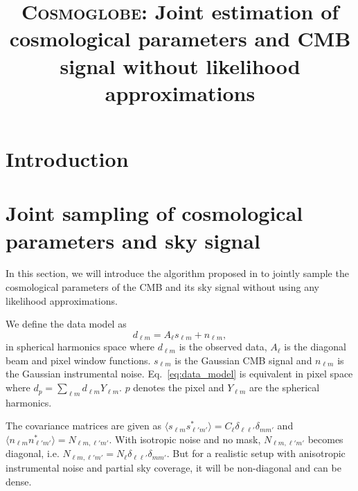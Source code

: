 \documentclass[twocolumn]{../common/aa}
\newcommand{\Cosmoglobe}{\textsc{Cosmoglobe}}
\begin{document}
\title{\bfseries{\Cosmoglobe: Joint estimation of cosmological parameters and CMB signal without likelihood approximations}}




\maketitle

\tableofcontents




\section{Introduction}
\label{sec:introduction}


\section{Joint sampling of cosmological parameters and sky signal}
\label{sec:methods}

In this section, we will introduce the algorithm proposed in \citet{racine:2016} to jointly sample the cosmological parameters of the CMB and its sky signal without using any likelihood approximations.

We define the data model as
\begin{equation}
    \label{eq:data_model}
    d_{\ell m} = A_{\ell} s_{\ell m} + n_{\ell m},
\end{equation}
in spherical harmonics space where $d_{\ell m}$ is the observed data, $A_\ell$ is the diagonal beam and pixel window functions. $s_{\ell m}$ is the Gaussian CMB signal and $n_{\ell m}$ is the Gaussian instrumental noise. Eq.~\eqref{eq:data_model} is equivalent in pixel space where $d_p = \sum_{\ell m} d_{\ell m} Y_{\ell m}$. $p$ denotes the pixel and $Y_{\ell m}$ are the spherical harmonics.

The covariance matrices are given as $\langle s_{\ell m}s_{\ell' m'}^* \rangle = C_{\ell} \delta_{\ell \ell'}\delta_{mm'}$ and $\langle n_{\ell m}n_{\ell' m'}^* \rangle = N_{\ell m, \ell' m'}$. With isotropic noise and no mask, $N_{\ell m, \ell' m'} $ becomes diagonal, i.e. $N_{\ell m, \ell' m'} = N_\ell \delta_{\ell \ell'}\delta_{mm'}$. But for a realistic setup with anisotropic instrumental noise and partial sky coverage, it will be non-diagonal and can be dense.
\end{document}
